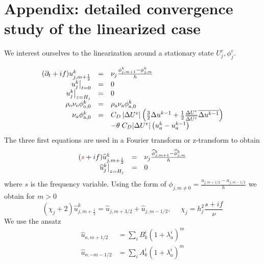 \section{Appendix: detailed convergence study of the linearized case}
\label{appendix:OASchwarz_LinearizedAnalysis}
We interest ourselves to the linearization around a stationary state 
$U^e_j, \phi^e_j$.

\begin{equation*}
\begin{array}{rcll}
	(\partial_t +if) u^{{k}}_{j,m+\frac{1}{2}} &=&
	\nu_j\frac{\phi^{{k}}_{j,m+1} - \phi^{{k}}_{j,m}}{h} \\
	\left.u^{{k}}_j\right|_{t=0} &=& 0 \\
	\left.u^{{k}}_j\right|_{z=H_j} &=& 0\\
	\rho_{\rm o} \nu_{\rm o} \phi^{{k}}_{{\rm o}, 0} &=&
	\rho_{\rm a} \nu_{\rm a} \phi^{{k}}_{{\rm a}, 0} \\
	\nu_a \phi_{{\rm a},0}^{{k}}
	&=& C_D \left|\Delta U^e\right| \left(\frac{3}{2} \Delta u^{
		{k-1}}
	+ \frac{1}{2} \frac{\Delta U^e}{\overline{\Delta U^e}}
		\overline{\Delta u^{
			{{k-1}}}}\right) \\
		&&-{\theta \; C_D|\Delta U^e|
		\left( u_a^{{k}} -
		u_a^{{k-1}}\right)}
\end{array}
\end{equation*}
The three first equations are used in a Fourier transform or
z-transform to obtain
\begin{equation}
\label{eq:FourierTransform}
\begin{array}{rcll}
	(\emphase{s} +if) \widehat{u}^{{k}}_{j,m+\frac{1}{2}} &=&
	\nu_j\frac{\widehat{\phi}^{{k}}_{j,m+1}
	- \widehat{\phi}^{{k}}_{j,m}}{h} \\
	\left.\widehat{u}^{{k}}_j\right|_{z=H_j} &=& 0\\
\end{array}
\end{equation}
where $s$ is the frequency variable.
Using the form of $\phi_{j, m \neq 0} = \frac{u_{j, m+1/2} -
u_{j, m-1/2}}{h}$
we obtain for $m>0$
\begin{equation}
\label{eq:diff_finies_on_u}
	(\chi_j+2) \widehat{u}^{{k}}_{j,m+\frac{1}{2}} =
	\widehat{u}_{j, m+3/2} + \widehat{u}_{j, m-1/2},
	~~~~~~ \chi_j = h_j^2\frac{s + if}{\nu}
\end{equation}
We use the ansatz
\begin{equation*}
\begin{aligned}
\widehat{u}_{a,m+1/2} &= \sum_i B_k^i (1+\lambda_a^i)^m \\
\widehat{u}_{o,-m-1/2} &= \sum_i A_k^i (1+\lambda_o^i)^{m}
\end{aligned}
\end{equation*}
